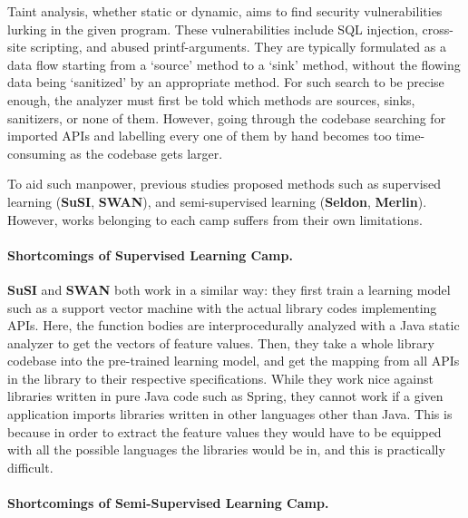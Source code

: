 \documentclass[acmsmall,review,anonymous]{acmart}\settopmatter{printfolios=true,printccs=false,printacmref=false}
\begin{document}

Taint analysis, whether static or dynamic, aims to find security vulnerabilities lurking
in the given program. These vulnerabilities include SQL injection, cross-site
scripting, and abused printf-arguments. They are typically formulated as a
data flow starting from a `source' method to a `sink' method, without the
flowing data being `sanitized' by an appropriate method. For such search to be
precise enough, the analyzer must first be told which methods are sources,
sinks, sanitizers, or none of them. However, going through the codebase
searching for imported APIs and labelling every one of them by hand becomes too
time-consuming as the codebase gets larger.

To aid such manpower, previous studies proposed methods such as supervised
learning (\textbf{SuSI}, \textbf{SWAN}), and semi-supervised learning (\textbf{Seldon}, \textbf{Merlin}).
However, works belonging to each camp suffers from their own limitations.

\paragraph{Shortcomings of Supervised Learning Camp.}

\textbf{SuSI} and \textbf{SWAN} both work in a similar way: they first train a learning model
such as a support vector machine with the actual library codes implementing
APIs. Here, the function bodies are interprocedurally analyzed with a Java
static analyzer to get the vectors of feature values. Then, they take a whole
library codebase into the pre-trained learning
model, and get the mapping from all APIs in the library to their respective
specifications. While they work nice against libraries written in pure Java
code such as Spring, they cannot work if a given application imports libraries
written in other languages other than Java. This is because in order to extract
the feature values they would have to be equipped with all the possible
languages the libraries would be in, and this is practically difficult.


\paragraph{Shortcomings of Semi-Supervised Learning Camp.}
\end{document}

